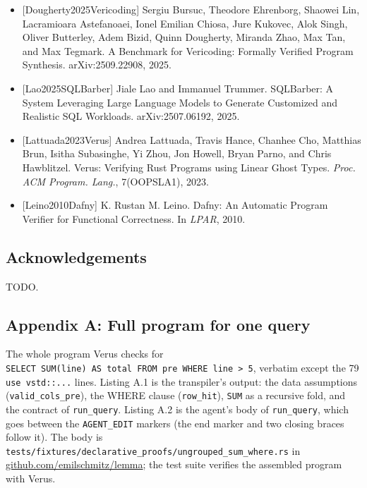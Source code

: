 \documentclass[
  10pt,
]{article}
\begin{document}
\begin{itemize}
  Welleck. AlphaVerus: Bootstrapping Formally Verified Code Generation
  through Self-Improving Translation and Treefinement. In \emph{ICML},
  2025.
\item
  {[}Dougherty2025Vericoding{]} Sergiu Bursuc, Theodore Ehrenborg,
  Shaowei Lin, Lacramioara Astefanoaei, Ionel Emilian Chiosa, Jure
  Kukovec, Alok Singh, Oliver Butterley, Adem Bizid, Quinn Dougherty,
  Miranda Zhao, Max Tan, and Max Tegmark. A Benchmark for Vericoding:
  Formally Verified Program Synthesis. arXiv:2509.22908, 2025.
\item
  {[}Lao2025SQLBarber{]} Jiale Lao and Immanuel Trummer. SQLBarber: A
  System Leveraging Large Language Models to Generate Customized and
  Realistic SQL Workloads. arXiv:2507.06192, 2025.
\item
  {[}Lattuada2023Verus{]} Andrea Lattuada, Travis Hance, Chanhee Cho,
  Matthias Brun, Isitha Subasinghe, Yi Zhou, Jon Howell, Bryan Parno,
  and Chris Hawblitzel. Verus: Verifying Rust Programs using Linear
  Ghost Types. \emph{Proc. ACM Program. Lang.}, 7(OOPSLA1), 2023.
\item
  {[}Leino2010Dafny{]} K. Rustan M. Leino. Dafny: An Automatic Program
  Verifier for Functional Correctness. In \emph{LPAR}, 2010.
\end{itemize}

\subsection{Acknowledgements}\label{acknowledgements}

TODO.

\subsection{Appendix A: Full program for one
query}\label{appendix-a-full-program-for-one-query}

The whole program Verus checks for
\texttt{SELECT\ SUM(line)\ AS\ total\ FROM\ pre\ WHERE\ line\ \textgreater{}\ 5},
verbatim except the 79 \texttt{use\ vstd::...} lines. Listing A.1 is the
transpiler's output: the data assumptions (\texttt{valid\_cols\_pre}),
the WHERE clause (\texttt{row\_hit}), \texttt{SUM} as a recursive fold,
and the contract of \texttt{run\_query}. Listing A.2 is the agent's body
of \texttt{run\_query}, which goes between the \texttt{AGENT\_EDIT}
markers (the end marker and two closing braces follow it). The body is
\texttt{tests/fixtures/declarative\_proofs/ungrouped\_sum\_where.rs} in
\href{https://github.com/emilschmitz/lemma}{github.com/emilschmitz/lemma};
the test suite verifies the assembled program with Verus.
\end{document}
